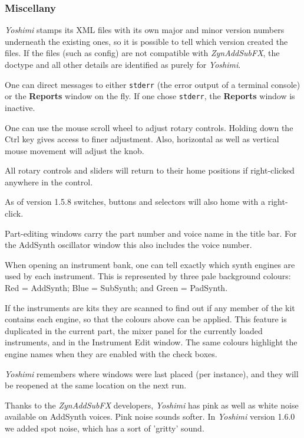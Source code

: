 \documentclass[
 11pt,
 twoside,
 a4paper,
 final                                 %
]{article}
\begin{document}
\subsubsection{Miscellany}
\label{subsubsec:new_features_miscellany}

   \textsl{Yoshimi} stamps its XML files
   with its own major
   and minor version numbers underneath the existing ones, so it is possible
   to tell which version created the files.
   If the files (such as config) are not compatible with
   \textsl{ZynAddSubFX},
   the doctype and all other details are identified as purely for
   \textsl{Yoshimi}.

   One can direct messages to either \texttt{stderr}
   (the error output of a terminal console) or the \textbf{Reports} window
   on the fly. If one chose \texttt{stderr}, the \textbf{Reports} window is
   inactive.

   One can use the mouse scroll wheel to adjust rotary controls. Holding
   down the Ctrl key gives access to finer adjustment.  Also, horizontal as
   well as vertical mouse movement will adjust the knob.

   All rotary controls and sliders will return
   to their home positions if right-clicked anywhere in the control.

   As of version 1.5.8 switches, buttons and
   selectors will also home with a right-click.

   Part-editing windows carry the part number and voice name in the title
   bar. For the AddSynth oscillator window this also includes the voice
   number.

   When opening an instrument bank, one can tell exactly which synth
   engines are used by each instrument. This is represented by three pale
   background colours: Red = AddSynth; Blue = SubSynth; and Green = PadSynth.

   If the instruments are kits they are scanned to find out if any member of the
   kit contains each engine, so that the colours above can be applied.
   This feature is duplicated in the current part, the mixer panel for the
   currently loaded instruments, and in the Instrument Edit window.
   The same colours highlight the engine names when they are enabled with the
   check boxes.

   \textsl{Yoshimi} remembers where windows were last placed (per instance),
   and they will be reopened at the same location on the next run.

   Thanks to the \textsl{ZynAddSubFX} developers, \textsl{Yoshimi} has pink
   as well as white noise available on AddSynth voices. Pink noise sounds
   softer.  In \textsl{Yoshimi} version 1.6.0 we added spot noise, which has
   a sort of 'gritty' sound.
\end{document}
